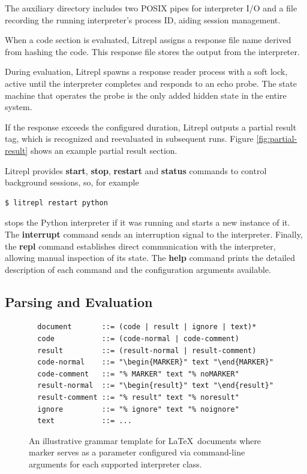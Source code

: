 \documentclass[letterpaper,12pt,twocolumn]{article}
\newcommand{\Latex}{\LaTeX\ }
\begin{document}
The auxiliary directory includes two POSIX pipes for interpreter I/O and a file
recording the running interpreter's process ID, aiding session management.

When a code section is evaluated, Litrepl assigns a response file name derived
from hashing the code. This response file stores the output from the
interpreter.

During evaluation, Litrepl spawns a response reader process with a soft lock,
active until the interpreter completes and responds to an echo probe. The state
machine that operates the probe is the only added hidden state in the entire
system.

If the response exceeds the configured duration, Litrepl outputs a partial
result tag, which is recognized and reevaluated in subsequent runs.  Figure
\ref{fig:partial-result} shows an example partial result section.

Litrepl provides \textbf{start}, \textbf{stop}, \textbf{restart} and
\textbf{status} commands to control background sessions, so, for example

\begin{verbatim}
$ litrepl restart python
\end{verbatim}

stops the Python interpreter if it was running and starts a new instance of it.
The \textbf{interrupt} command sends an interruption signal to the interpreter.
Finally, the \textbf{repl} command establishes direct communication with the
interpreter, allowing manual inspection of its state. The \textbf{help} command
prints the detailed description of each command and the configuration
arguments available.

\subsection{Parsing and Evaluation}

\begin{figure}[hbt!]
  \centering
  \begin{minipage}{\textwidth}
  \begin{verbatim}
  document       ::= (code | result | ignore | text)*
  code           ::= (code-normal | code-comment)
  result         ::= (result-normal | result-comment)
  code-normal    ::= "\begin{MARKER}" text "\end{MARKER}"
  code-comment   ::= "% MARKER" text "% noMARKER"
  result-normal  ::= "\begin{result}" text "\end{result}"
  result-comment ::= "% result" text "% noresult"
  ignore         ::= "% ignore" text "% noignore"
  text           ::= ...
  \end{verbatim}
  \end{minipage}
  \caption{An illustrative grammar template for \Latex documents where marker
  serves as a parameter configured via command-line arguments for each supported
  interpreter class.}
  \label{fig:document-representation}
\end{figure}
\end{document}
